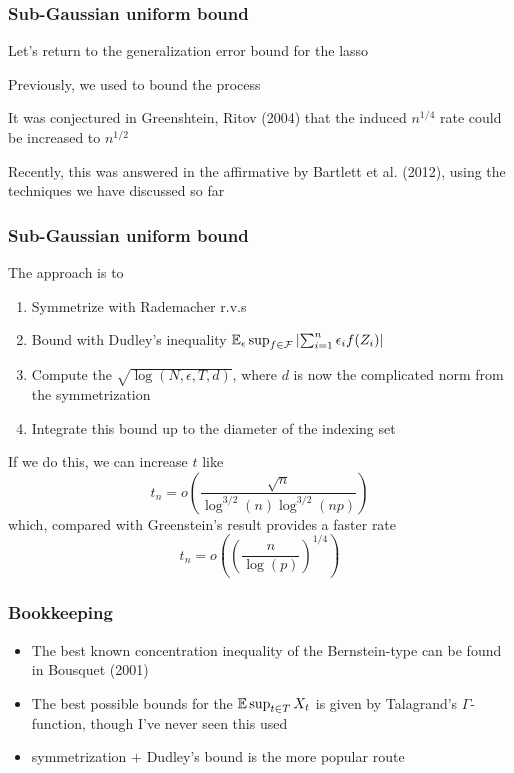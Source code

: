 \documentclass[12pt]{beamer}
\begin{document}
\begin{frame}[fragile]
\frametitle{Sub-Gaussian uniform bound}
Let's return to the generalization error bound for the lasso

\vsp
Previously, we used  to bound the process

\vsp
It was conjectured in Greenshtein, Ritov (2004) that the induced $n^{1/4}$ rate could be increased to $n^{1/2}$


\vsp
Recently, this was answered in the affirmative by Bartlett et al. (2012), using the techniques we have discussed so far

\end{frame}

\begin{frame}[fragile]
\frametitle{Sub-Gaussian uniform bound}
The approach is to
\begin{enumerate}
\item Symmetrize with Rademacher r.v.s
\item Bound with Dudley's inequality $\mathbb{E}_\epsilon \sup_{f\in \mathcal{F}} \left| \sum_{i=1}^n \epsilon_i f(Z_i) \right|$
\item Compute the $\sqrt{\log(N,\epsilon,T,d)}$, where $d$ is now the complicated norm from the symmetrization
\item Integrate this bound up to the diameter of the indexing set
\end{enumerate}

\vsp
If we do this, we can increase $t$ like
\[
t_n = o\left( \frac{\sqrt{n}}{\log^{3/2}(n) \log^{3/2}(n p)}\right)
\]
which, compared with Greenstein's result provides a faster rate
\[
t_n = o\left( \left(\frac{n}{\log( p)}\right)^{1/4}\right)
\]
\end{frame}

\begin{frame}[fragile]
\frametitle{Bookkeeping}
\begin{itemize}
\item The best known concentration inequality of the Bernstein-type can be found in Bousquet (2001)
\item The best possible bounds for the $\mathbb{E} \sup_{t \in T} X_t$ is given by Talagrand's $\Gamma$-function,
though I've never seen this used
\item symmetrization $+$ Dudley's bound is the more popular route
\end{itemize}

\end{frame}
%
\end{document}
